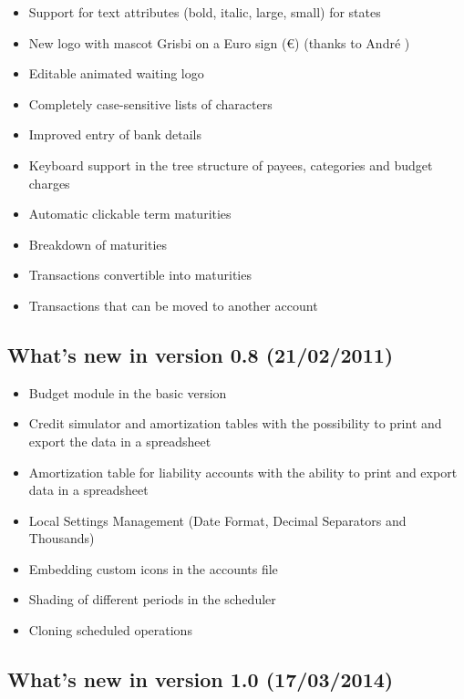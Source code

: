 \begin{itemize}
	\item Support for text attributes (bold, italic, large, small) for states
	\item New logo with mascot Grisbi on a Euro sign (€) (thanks to André )
	\item Editable animated waiting logo
	\item Completely case-sensitive lists of characters
	\item Improved entry of bank details
	\item Keyboard support in the tree structure of payees, categories and budget charges
	\item Automatic clickable term maturities
	\item Breakdown of maturities
	\item Transactions convertible into maturities
	\item Transactions that can be moved to another account
\end{itemize}

\subsection{What's new in version 0.8 \textnormal{(21/02/2011)}}

\begin{itemize}
	\item Budget module in the basic version
	\item Credit simulator and amortization tables with the possibility to print and export the data in a spreadsheet
	\item Amortization table for liability accounts with the ability to print and export data in a spreadsheet
	\item Local Settings Management (Date Format, Decimal Separators and Thousands)
	\item Embedding custom icons in the accounts file
	\item Shading of different periods in the scheduler
	\item Cloning scheduled operations
\end{itemize}

\subsection{What's new in version 1.0 \textnormal{(17/03/2014)}}

